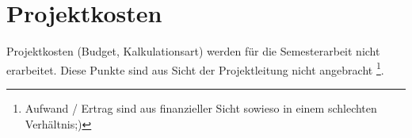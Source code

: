 \chapter{Projektkosten}
Projektkosten (Budget, Kalkulationsart) werden f\"ur die Semesterarbeit nicht erarbeitet. Diese Punkte sind aus Sicht der Projektleitung nicht angebracht \footnote{Aufwand / Ertrag sind aus finanzieller Sicht sowieso in einem schlechten Verh\"altnis;)}.